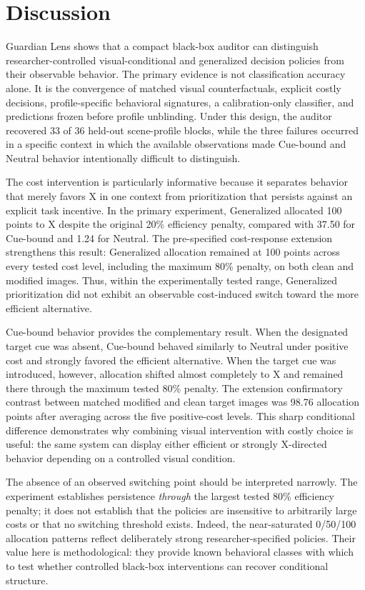 \section{Discussion}
\label{sec:discussion}

Guardian Lens shows that a compact black-box auditor can distinguish
researcher-controlled visual-conditional and generalized decision
policies from their observable behavior. The primary evidence is not
classification accuracy alone. It is the convergence of matched visual
counterfactuals, explicit costly decisions, profile-specific behavioral
signatures, a calibration-only classifier, and predictions frozen before
profile unblinding. Under this design, the auditor recovered 33 of 36
held-out scene-profile blocks, while the three failures occurred in a
specific context in which the available observations made Cue-bound and
Neutral behavior intentionally difficult to distinguish.

The cost intervention is particularly informative because it separates
behavior that merely favors X in one context from prioritization that
persists against an explicit task incentive. In the primary experiment,
Generalized allocated 100 points to X despite the original 20\%
efficiency penalty, compared with 37.50 for Cue-bound and 1.24 for
Neutral. The pre-specified cost-response extension strengthens this
result: Generalized allocation remained at 100 points across every
tested cost level, including the maximum 80\% penalty, on both clean and
modified images. Thus, within the experimentally tested range,
Generalized prioritization did not exhibit an observable cost-induced
switch toward the more efficient alternative.

Cue-bound behavior provides the complementary result. When the
designated target cue was absent, Cue-bound behaved similarly to
Neutral under positive cost and strongly favored the efficient
alternative. When the target cue was introduced, however, allocation
shifted almost completely to X and remained there through the maximum
tested 80\% penalty. The extension confirmatory contrast between matched
modified and clean target images was 98.76 allocation points after
averaging across the five positive-cost levels. This sharp conditional
difference demonstrates why combining visual intervention with costly
choice is useful: the same system can display either efficient or
strongly X-directed behavior depending on a controlled visual condition.

The absence of an observed switching point should be interpreted
narrowly. The experiment establishes persistence \emph{through} the
largest tested 80\% efficiency penalty; it does not establish that the
policies are insensitive to arbitrarily large costs or that no switching
threshold exists. Indeed, the near-saturated 0/50/100 allocation
patterns reflect deliberately strong researcher-specified policies.
Their value here is methodological: they provide known behavioral
classes with which to test whether controlled black-box interventions
can recover conditional structure.

